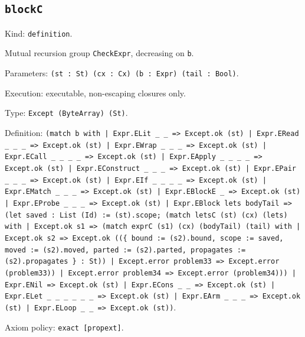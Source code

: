 \documentclass[11pt]{article}
\begin{document}
\subsection*{\texttt{blockC}}
\noindent Kind: \texttt{definition}.\par
\noindent Mutual recursion group \texttt{CheckExpr}, decreasing on \texttt{b}.\par
\noindent Parameters: \texttt{(st : St) (cx : Cx) (b : Expr) (tail : Bool)}.\par
\noindent Execution: executable, non-escaping closures only.\par
\noindent Type: \texttt{Except (ByteArray) (St)}.\par
\noindent Definition: \texttt{(match b with | Expr.ELit \_ \_ => Except.ok (st) | Expr.ERead \_ \_ \_ => Except.ok (st) | Expr.EWrap \_ \_ \_ => Except.ok (st) | Expr.ECall \_ \_ \_ \_ => Except.ok (st) | Expr.EApply \_ \_ \_ \_ => Except.ok (st) | Expr.EConstruct \_ \_ \_ => Except.ok (st) | Expr.EPair \_ \_ \_ => Except.ok (st) | Expr.EIf \_ \_ \_ \_ => Except.ok (st) | Expr.EMatch \_ \_ \_ => Except.ok (st) | Expr.EBlockE \_ => Except.ok (st) | Expr.EProbe \_ \_ \_ => Except.ok (st) | Expr.EBlock lets bodyTail => (let saved : List (Id) := (st).scope; (match letsC (st) (cx) (lets) with | Except.ok s1 => (match exprC (s1) (cx) (bodyTail) (tail) with | Except.ok s2 => Except.ok ((\{ bound := (s2).bound, scope := saved, moved := (s2).moved, parted := (s2).parted, propagates := (s2).propagates \} : St)) | Except.error problem33 => Except.error (problem33)) | Except.error problem34 => Except.error (problem34))) | Expr.ENil => Except.ok (st) | Expr.ECons \_ \_ => Except.ok (st) | Expr.ELet \_ \_ \_ \_ \_ \_ => Except.ok (st) | Expr.EArm \_ \_ \_ => Except.ok (st) | Expr.ELoop \_ \_ => Except.ok (st))}.\par
\noindent Axiom policy: \texttt{exact [propext]}.\par
\end{document}
